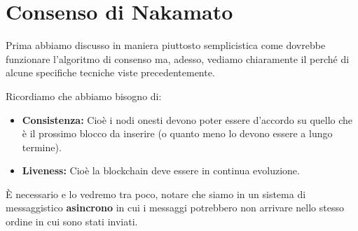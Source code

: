 \chapter{Consenso di Nakamato}
Prima abbiamo discusso in maniera piuttosto semplicistica come dovrebbe funzionare l'algoritmo di consenso ma, adesso, vediamo chiaramente il perché di alcune specifiche tecniche viste precedentemente.

Ricordiamo che abbiamo bisogno di:
\begin{itemize}
    \item \textbf{Consistenza: }Cioè i nodi onesti devono poter essere d'accordo su quello che è il prossimo blocco da inserire (o quanto meno lo devono essere a lungo termine).
    \item \textbf{Liveness: }Cioè la blockchain deve essere in continua evoluzione.
\end{itemize}
È necessario e lo vedremo tra poco, notare che siamo in un sistema di messaggistico \textbf{asincrono} in cui i messaggi potrebbero non arrivare nello stesso ordine in cui sono stati inviati.

